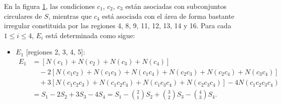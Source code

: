 En la figura \ref{UAJSBSNZSKKS}, las condiciones $c_1$, $c_2$, $c_3$ están asociadas con subconjuntos circulares de $S$, mientras que $c_4$ está asociada con el área de forma bastante irregular constituida por las regiones 4, 8, 9, 11, 12, 13, 14 y 16. Para cada $1 \leq i \leq 4$, $E_i$ está determinada como sigue:
\begin{itemize}
    \item $E_1$ [regiones 2, 3, 4, 5]:
    \begin{align*}
        E_1 & = \left[N\left(c_1\right) + N\left(c_2\right) + N\left(c_3\right) + N\left(c_4\right)\right]  \\
        & \quad -2\left[N\left(c_1 c_2\right)+N\left(c_1 c_3\right)+N\left(c_1 c_4\right)+N\left(c_2 c_3\right)+N\left(c_2 c_4\right)+N\left(c_3 c_4\right)\right] \\
        & \quad +3\left[N\left(c_1 c_2 c_3\right)+N\left(c_1 c_2 c_4\right)+N\left(c_1 c_3 c_4\right)+N\left(c_2 c_3 c_4\right)\right] - 4 N\left(c_1 c_2 c_3 c_4\right) \\
        & = S_1-2 S_2+3 S_3-4 S_4 =S_1-\binom{2}{1} S_2 + \binom{3}{2} S_3-\binom{4}{3} S_4 .
    \end{align*}
    
    \begin{figure}[h!]
    \centering
    \caption{~}\label{UAJSBSNZSKKS}
    \end{figure}
\end{itemize}

